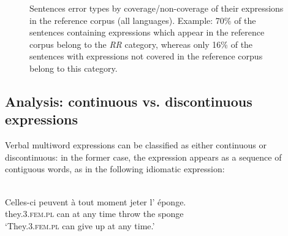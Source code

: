 \documentclass[output=paper,modfonts,nonflat]{langsci/langscibook}
\begin{document}
\begin{figure}
  \caption{{Sentences error types by coverage/non-coverage of
      their expressions in the reference corpus (all languages).}  Example: 70\% of
    the sentences containing expressions which appear in the reference
    corpus belong to the {\em RR} category, whereas only 16\% of the
    sentences with expressions not covered in the reference corpus
    belong to this category.\label{fig:coverage}}
\end{figure}


\subsection{Analysis: continuous vs. discontinuous expressions}
\label{analysisContig}

Verbal multiword expressions can be classified as either continuous
or discontinuous: in the former case, the expression appears as a sequence of
contiguous words, as in the following idiomatic expression:

\vspace*{.2cm}

\begin{minipage}{\linewidth}
\ea 
{}\\
\gll Celles-ci peuvent à tout moment jeter l' éponge.\\
     they.\textsc{3.fem.pl} can at any time throw the sponge\\
\glt `They.\textsc{3.fem.pl} can give up at any time.'\\
\z
\end{minipage}\\
\\
\end{document}
